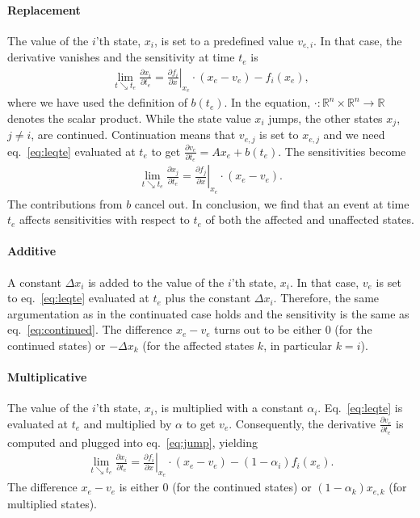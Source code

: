 \documentclass[journal, a4paper]{IEEEtran}
\begin{document}
\paragraph{Replacement} 
The value of the $i$'th state, $x_i$, is set to a predefined value $v_{e, i}$. In that case, the derivative vanishes and the sensitivity at time $t_e$ is
\begin{align}
    \lim_{t\searrow t_e}\frac{\partial x_i}{\partial t_e} = \left.\frac{\partial f_i}{\partial x}\right|_{x_e}\cdot (x_e - v_e) - f_i(x_e),
    \label{eq:replace}
\end{align}
where we have used the definition of $b(t_e)$. In the equation, $\cdot: \mathbb R^n\times \mathbb R^n\rightarrow \mathbb R$ denotes the scalar product. While the state value $x_i$ jumps, the other states $x_j$, $j\neq i$, are continued. Continuation means that $v_{e, j}$ is set to $x_{e, j}$ and we need eq.~\eqref{eq:leqte} evaluated at $t_e$ to get $\frac{\partial v_e}{\partial t_e} = Ax_e + b(t_e)$. The sensitivities become 
\begin{align}
    \lim_{t\searrow t_e}\frac{\partial x_j}{\partial t_e} = \left.\frac{\partial f_j}{\partial x}\right|_{x_e}\cdot (x_e - v_e).\label{eq:continued}
\end{align}
The contributions from $b$ cancel out. In conclusion, we find that an event at time $t_e$ affects sensitivities with respect to $t_e$ of both the affected and unaffected states.\\

\paragraph{Additive} 
A constant $\Delta x_i$ is added to the value of the $i$'th state, $x_i$. In that case, $v_e$ is set to eq.~\eqref{eq:leqte} evaluated at $t_e$ plus the constant $\Delta x_i$. Therefore, the same argumentation as in the continuated case holds and the sensitivity is the same as eq.~\eqref{eq:continued}. The difference $x_e - v_e$ turns out to be either 0 (for the continued states) or $-\Delta x_k$ (for the affected states $k$, in particular $k = i$).\\

\paragraph{Multiplicative}
The value of the $i$'th state, $x_i$, is multiplied with a constant $\alpha_i$. Eq.~\eqref{eq:leqte} is evaluated at $t_e$ and multiplied by $\alpha$ to get $v_e$. Consequently, the derivative $\frac{\partial v_e}{\partial t_e}$ is computed and plugged into eq.~\eqref{eq:jump}, yielding
\begin{align}
    \lim_{t\searrow t_e}\frac{\partial x_i}{\partial t_e} = \left.\frac{\partial f_i}{\partial x}\right|_{x_e}\cdot (x_e - v_e) - (1-\alpha_i)f_i(x_e).
\end{align}
The difference $x_e - v_e$ is either 0 (for the continued states) or $(1-\alpha_k)x_{e, k}$ (for multiplied states).
\end{document}
